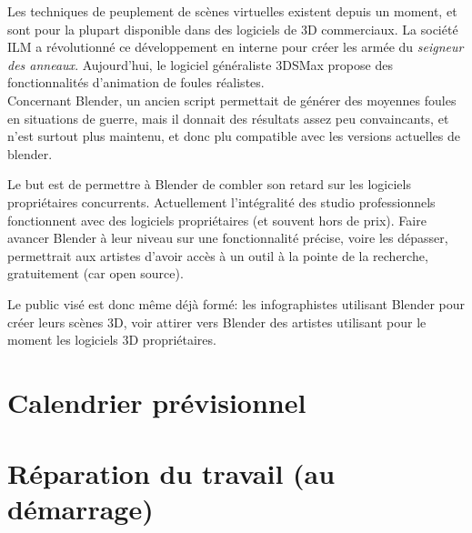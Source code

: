 \documentclass[a4paper,12pt]{article}
\begin{document}
Les techniques de peuplement de scènes virtuelles existent depuis un moment, et sont pour la plupart disponible dans des logiciels de 3D commerciaux. La société ILM a révolutionné ce développement en interne pour créer les armée du \textit{seigneur des anneaux}. Aujourd'hui, le logiciel généraliste 3DSMax propose des fonctionnalités d'animation de foules réalistes. \\
Concernant Blender, un ancien script permettait de générer des moyennes foules en situations de guerre, mais il donnait des résultats assez peu convaincants, et n'est surtout plus maintenu, et donc plu compatible avec les versions actuelles de blender.

Le but est de permettre à Blender de combler son retard sur les logiciels propriétaires concurrents. Actuellement l'intégralité des studio professionnels fonctionnent avec des logiciels propriétaires (et souvent hors de prix). Faire avancer Blender à leur niveau sur une fonctionnalité précise, voire les dépasser, permettrait aux artistes d'avoir accès à un outil à la pointe de la recherche, gratuitement (car open source).

Le public visé est donc même déjà formé: les infographistes utilisant Blender pour créer leurs scènes 3D, voir attirer vers Blender des artistes utilisant pour le moment les logiciels 3D propriétaires.

\section{Calendrier prévisionnel}


\section{Réparation du travail (au démarrage)}
\end{document}
